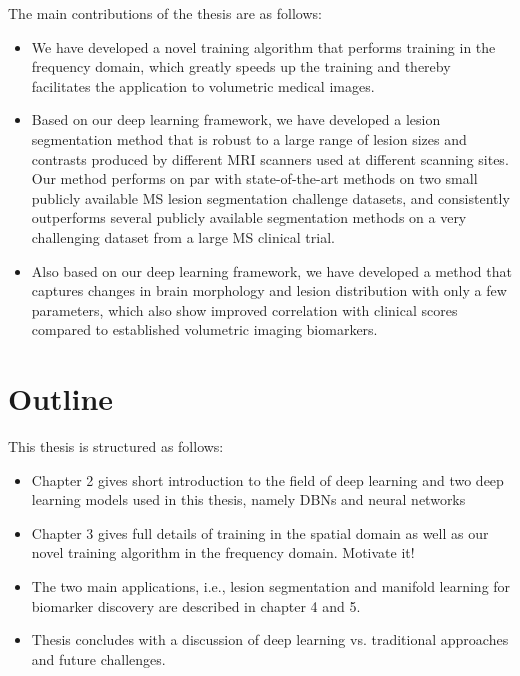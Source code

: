 The main contributions of the thesis are as follows:
\begin{itemize}
\item We have developed a novel training algorithm that performs training in the
frequency domain, which greatly speeds up the training and thereby facilitates
the application to volumetric medical images.
  
\item Based on our deep learning framework, we have developed a lesion
segmentation method that is robust to a large range of lesion sizes and contrasts produced by
different MRI scanners used at different scanning sites. Our method performs on
par with state-of-the-art methods on two small publicly available MS lesion
segmentation challenge datasets, and consistently outperforms several publicly
available segmentation methods on a very challenging dataset from a large MS
clinical trial.

\item Also based on our deep learning framework, we have developed a method that
captures changes in brain morphology and lesion distribution with only a few
parameters, which also show improved correlation with clinical scores compared
to established volumetric imaging biomarkers.

\end{itemize}

\section{Outline}

This thesis is structured as follows:
\begin{itemize}
\item Chapter 2 gives short introduction to the field of deep learning and two
deep learning models used in this thesis, namely DBNs and neural networks
\item Chapter 3 gives full details of training in the spatial domain as well as
our novel training algorithm in the frequency domain. Motivate it!
\item The two main applications, i.e., lesion segmentation and manifold learning
for biomarker discovery are described in chapter 4 and 5.
\item Thesis concludes with a discussion of deep learning vs. traditional
approaches and future challenges.
\end{itemize}


